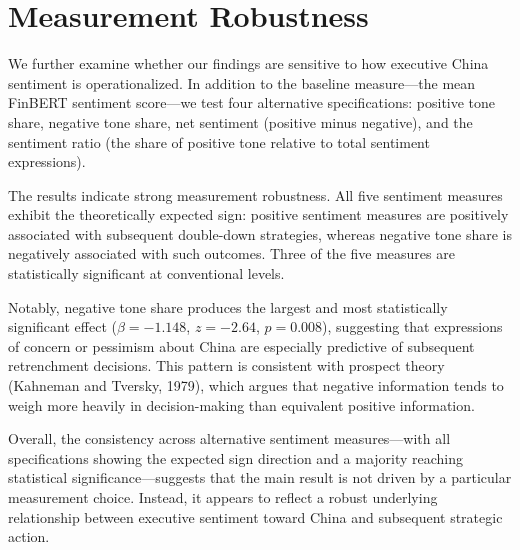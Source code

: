 \documentclass{article}
\begin{document}
\section{Measurement Robustness}\label{measurement-robustness}

We further examine whether our findings are sensitive to how executive
China sentiment is operationalized. In addition to the baseline
measure---the mean FinBERT sentiment score---we test four alternative
specifications: positive tone share, negative tone share, net sentiment
(positive minus negative), and the sentiment ratio (the share of
positive tone relative to total sentiment expressions).

The results indicate strong measurement robustness. All five sentiment
measures exhibit the theoretically expected sign: positive sentiment
measures are positively associated with subsequent double-down
strategies, whereas negative tone share is negatively associated with
such outcomes. Three of the five measures are statistically significant
at conventional levels.

Notably, negative tone share produces the largest and most statistically
significant effect ($\beta = -1.148$, $z = -2.64$, $p = 0.008$), suggesting
that expressions of concern or pessimism about China are especially
predictive of subsequent retrenchment decisions. This pattern is
consistent with prospect theory (Kahneman and Tversky, 1979), which
argues that negative information tends to weigh more heavily in
decision-making than equivalent positive information.

Overall, the consistency across alternative sentiment measures---with
all specifications showing the expected sign direction and a majority
reaching statistical significance---suggests that the main result is not
driven by a particular measurement choice. Instead, it appears to
reflect a robust underlying relationship between executive sentiment
toward China and subsequent strategic action.
\end{document}
